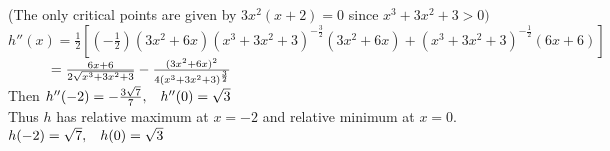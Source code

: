 \documentclass[12pt]{amsart}
\begin{document}
\begin{enumerate}
\begin{enumerate}
				(The only critical points are given by $3x^2(x+2)=0$ since $x^3+3x^2+3>0)$ \\
				
				$h''(x) = \frac{1}{2}\left[\left(-\frac{1}{2}\right)(3x^2+6x)(x^3+3x^2+3)^{-\frac{3}{2}}
				(3x^2+6x)+(x^3+3x^2+3)^{-\frac{1}{2}}(6x+6)\right]$ \\
				
				$\text{ } \hspace{0.845cm} = \frac{6x+6}{2\sqrt{x^3+3x^2+3}}-
				\frac{(3x^2+6x)^2}{4(x^3+3x^2+3)^\frac{3}{2}}$ \\
				
				Then $h''(-2) = -\frac{3\sqrt{7}}{7}, \hspace{0.3cm} h''(0)=\sqrt{3} $ \\
				
				Thus $h$ has relative maximum at $x=-2$ and relative minimum at $x=0$. \\
				
				$h(-2)=\sqrt{7}, \hspace{0.3cm} h(0) = \sqrt{3}$ \\
				
		\end{enumerate}
	

\end{enumerate}
\end{document}
